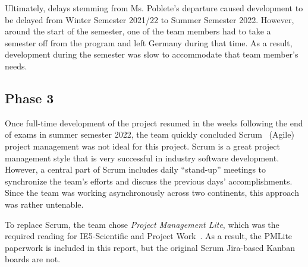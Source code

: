 Ultimately, delays stemming from Ms. Poblete's departure caused development to be delayed from Winter Semester 2021/22 to Summer Semester 2022.
However, around the start of the semester, one of the team members had to take a semester off from the program and left Germany during that time.
As a result, development during the semester was slow to accommodate that team member's needs.

\subsection{Phase 3}\label{subsec:phase-3}
Once full-time development of the project resumed in the weeks following the end of exams in summer semester 2022, the team quickly concluded Scrum~\cite{scrum} (Agile) project management was not ideal for this project.
Scrum is a great project management style that is very successful in industry software development.
However, a central part of Scrum includes daily ``stand-up'' meetings to synchronize the team's efforts and discuss the previous days' accomplishments.
Since the team was working asynchronously across two continents, this approach was rather untenable.

To replace Scrum, the team chose \emph{Project Management Lite}, which was the required reading for IE5-Scientific and Project Work~\cite{pmlite}.
As a result, the PMLite paperwork is included in this report, but the original Scrum Jira-based Kanban boards are not.